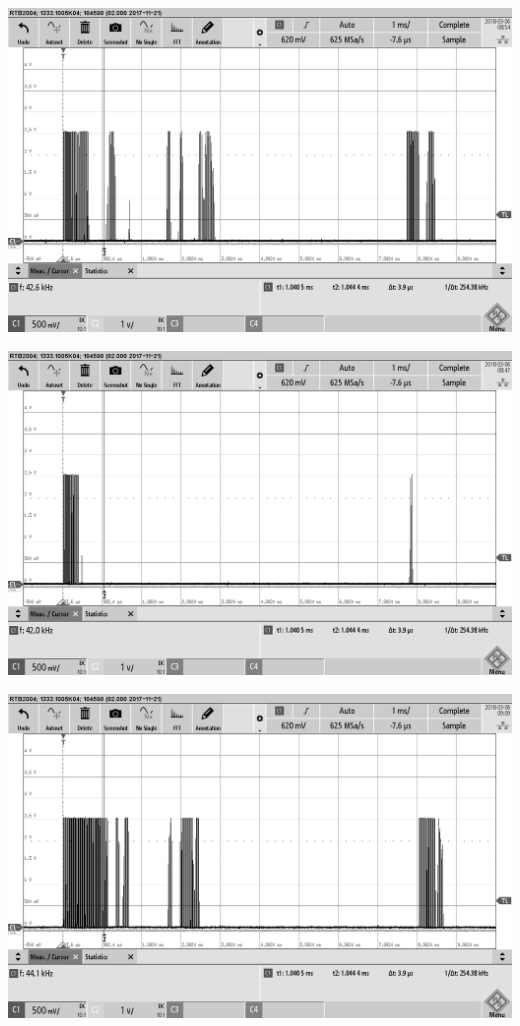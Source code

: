 \begin{minipage}{0.5\textwidth}
\includegraphics[width=1\textwidth, draft]{Abbildungen/Messungen4,6V/MURATAr1,5m.png}
\label{fig:EKULIT1,5m}
\end{minipage}
\begin{minipage}{0.5\textwidth}
\includegraphics[width=1\textwidth, draft]{Abbildungen/Messungen4,6V/MURATAs1,5m.png}
\label{fig:EKULIT1,5m}
\end{minipage}
\begin{minipage}{0.5\textwidth}
\includegraphics[width=1\textwidth, draft]{Abbildungen/Messungen4,6V/MURATAsr1,5m.png}
\label{fig:EKULIT1,5m}
\end{minipage}


